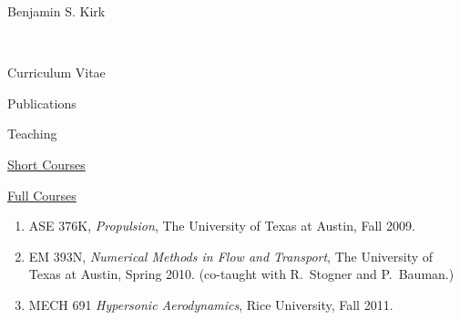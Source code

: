 \documentclass[11pt]{report}
\begin{document}
\begin{cv}{\centerline{Benjamin S. Kirk}\\
    \centerline{\small Curriculum Vitae}}
\begin{cvlist}{Publications}

      
    \end{cvlist}

  \begin{cvlist}{Teaching}

    \item[\underline{Short Courses}]    

    \vspace{1em}
    \item[\underline{Full Courses}] 
      \begin{enumerate}
        \item ASE 376K, \emph{Propulsion}, The University of Texas at Austin, Fall 2009.
        \item EM 393N, \emph{Numerical Methods in Flow and Transport}, The University of Texas at Austin, Spring 2010. (co-taught with R.~Stogner and P.~Bauman.)
        \item MECH 691 \emph{Hypersonic Aerodynamics}, Rice University, Fall 2011.
      \end{enumerate}
  \end{cvlist}



\end{cv}
\end{document}
